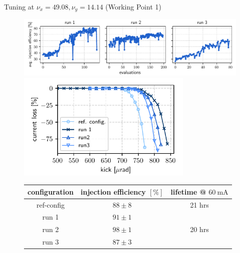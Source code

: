 \documentclass[aspectratio=169]{beamer}
\begin{document}
\begin{frame}{Tuning at $\nu_x = 49.08, \nu_y = 14.14$ (Working Point 1)}
    \begin{minipage}{0.56\textwidth}
        \begin{figure}
            \centering
            \includegraphics[width=\textwidth]{oldtunes_history.pdf}
            \pause
            \includegraphics[width = 0.75\textwidth]{WEPL087_f1.pdf}
            \scriptsize
            \begin{table}[]
                \begin{tabular}{ccc}
                \hline
                configuration & injection efficiency $[\%]$ & lifetime @ $\unit{60~\milli\ampere}$ \\ \hline
                ref-config    & $88\pm8$                    & 21 hrs    \\
                run 1         & $91\pm1$                    &           \\
                run 2         & $98\pm1$                    &  20 hrs   \\
                run 3         & $87\pm3$                    &           \\ \hline
                \end{tabular}
                \end{table}
        \end{figure}
    \end{minipage}
    \hfill
    \begin{minipage}{0.42\textwidth}
        \begin{figure}

\end{figure}
\end{minipage}
\end{frame}
\end{document}
